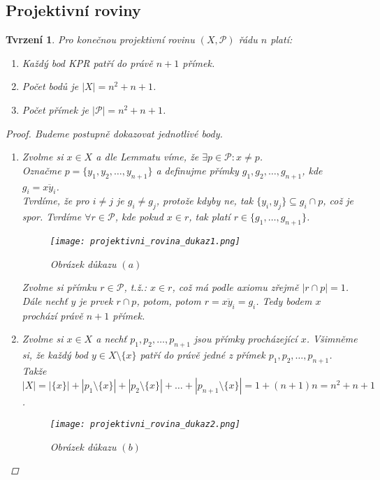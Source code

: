 \documentclass[10pt,a4paper]{article}
\newtheorem{tvrzeni}{Tvrzení}
\newcommand{\Pp}{{\mathcal{P}}}     %
\newcommand\makesmall{\fontsize{8pt}{11pt}\selectfont}
\begin{document}
\newpage
\subsection{Projektivní roviny}

\begin{tvrzeni} Pro konečnou projektivní rovinu $(X, \Pp)$ řádu $n$ platí:
    \begin{enumerate}[label=(\alph*)]
        \item Každý bod KPR patří do právě $n+1$ přímek.
        \item Počet bodů je $|X| = n^2 + n + 1$.
        \item Počet přímek je $|\Pp| = n^2 + n + 1$.
    \end{enumerate}

    \begin{proof} Budeme postupně dokazovat jednotlivé body.
        \begin{enumerate}[label=(\alph*)]
            \item Zvolme si $x\in X$ a dle Lemmatu víme, že $\exists p \in \Pp: x\neq p$.\\
            Označme $p = \{y_1, y_2, \dots, y_{n+1}\}$ a definujme přímky $g_1, g_2, \dots, g_{n+1}$, kde $g_i= \overline{xy_i}$.\\
            Tvrdíme, že pro $i\neq j$ je $g_i\neq g_j$, protože kdyby ne, tak $\{y_i, y_j\} \subseteq g_i \cap p$, což je spor.
            Tvrdíme $\forall r \in \Pp$, kde pokud $x\in r$, tak platí $r \in \{g_1, \dots, g_{n+1}\}$.
            \begin{figure}[h]
                \caption{\makesmall\textit{Obrázek důkazu $(a)$}}
                \centering
                \texttt{[image: projektivni\_rovina\_dukaz1.png]}
            \end{figure}

            Zvolme si přímku $r\in \Pp$, t.ž.: $x\in r$, což má podle axiomu zřejmě $|r\cap p|=1$. 
            Dále nechť $y$ je prvek $r\cap p$, potom, potom $r = \overline{xy_i} = g_i$. Tedy bodem $x$ prochází právě $n+1$ přímek.

            \item Zvolme si $x\in X$ a nechť $p_1, p_2, \dots, p_{n+1}$ jsou přímky procházející $x$. 
            Všimněme si, že každý bod $y\in X\setminus\{x\}$ patří do právě jedné z přímek $p_1, p_2, \dots, p_{n+1}$.\\
            Takže $|X|=|\{x\}| + |p_1\setminus \{x\}| + |p_2\setminus \{x\}| + \dots + |p_{n+1}\setminus \{x\}|= 1 + (n+1)n = n^2+n+1$.
            \begin{figure}[h]
                \caption{\makesmall\textit{Obrázek důkazu $(b)$}}
                \centering
                \texttt{[image: projektivni\_rovina\_dukaz2.png]}
            \end{figure}


\end{enumerate}
\end{proof}
\end{tvrzeni}
\end{document}
